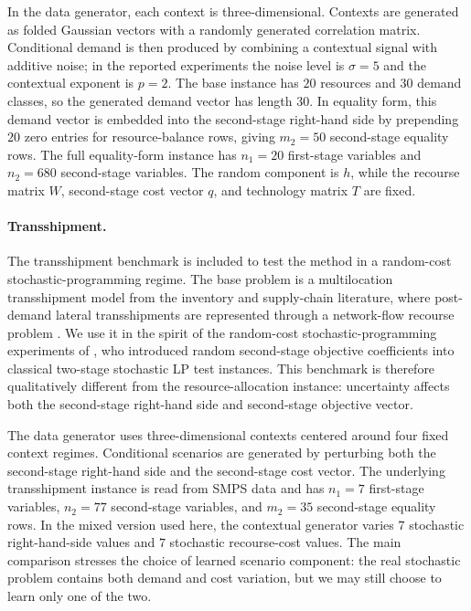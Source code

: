 \documentclass{article}
\newcommand{\1}{\mathbf{1}}
\theoremstyle{plain}
\theoremstyle{definition}
\theoremstyle{remark}
\begin{document}
In the data generator, each context is three-dimensional. Contexts are generated as folded Gaussian vectors with a randomly generated correlation matrix. Conditional demand is then produced by combining a contextual signal with additive noise; in the reported experiments the noise level is $\sigma=5$ and the contextual exponent is $p=2$. The base instance has $20$ resources and $30$ demand classes, so the generated demand vector has length $30$. In equality form, this demand vector is embedded into the second-stage right-hand side by prepending $20$ zero entries for resource-balance rows, giving $m_2=50$ second-stage equality rows. The full equality-form instance has $n_1=20$ first-stage variables and $n_2=680$ second-stage variables. The random component is $h$, while the recourse matrix $W$, second-stage cost vector $q$, and technology matrix $T$ are fixed.

\paragraph{Transshipment.}
The transshipment benchmark is included to test the method in a random-cost stochastic-programming regime. The base problem is a multilocation transshipment model from the inventory and supply-chain literature, where post-demand lateral transshipments are represented through a network-flow recourse problem \citep{herer2006multilocation}. We use it in the spirit of the random-cost stochastic-programming experiments of \citet{gangammanavar2021stochastic}, who introduced random second-stage objective coefficients into classical two-stage stochastic LP test instances. This benchmark is therefore qualitatively different from the resource-allocation instance: uncertainty affects both the second-stage right-hand side and second-stage objective vector.

The data generator uses three-dimensional contexts centered around four fixed context regimes. Conditional scenarios are generated by perturbing both the second-stage right-hand side and the second-stage cost vector. The underlying transshipment instance is read from SMPS data and has $n_1=7$ first-stage variables, $n_2=77$ second-stage variables, and $m_2=35$ second-stage equality rows. In the mixed version used here, the contextual generator varies $7$ stochastic right-hand-side values and $7$ stochastic recourse-cost values. The main comparison stresses the choice of learned scenario component: the real stochastic problem contains both demand and cost variation, but we may still choose to learn only one of the two.
\end{document}
